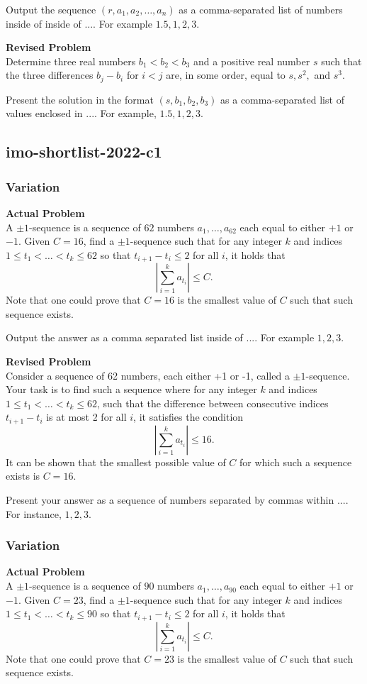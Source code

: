 Output the sequence $(r, a_1, a_2, \ldots, a_n)$ as a comma-separated list of numbers inside of inside of $\boxed{...}$. For example $\boxed{1.5, 1, 2, 3}$.

\textbf{Revised Problem}\\
Determine three real numbers \( b_1 < b_2 < b_3 \) and a positive real number \( s \) such that the three differences \( b_j - b_i \) for \( i < j \) are, in some order, equal to \( s, s^2, \) and \( s^3 \).

Present the solution in the format \((s, b_1, b_2, b_3)\) as a comma-separated list of values enclosed in \(\boxed{...}\). For example, \(\boxed{1.5, 1, 2, 3}\).

\subsection{imo-shortlist-2022-c1}
\subsubsection{Variation}
\textbf{Actual Problem}\\
A $\pm 1$-sequence is a sequence of $62$ numbers $a_1, \ldots, a_{62}$ each equal to either $+1$ or $-1$. 
Given $C = 16$, find a $\pm 1$-sequence such that for any integer $k$ and indices $1 \le t_1 < \ldots < t_k \le 62$ so that $t_{i+1} - t_i \le 2$ for all $i$, it holds that $$\left| \sum_{i = 1}^{k} a_{t_i} \right| \leq C.$$
Note that one could prove that $C = 16$ is the smallest value of $C$ such that such sequence exists.


Output the answer as a comma separated list inside of $\boxed{...}$. For example $\boxed{1, 2, 3}$.

\textbf{Revised Problem}\\
Consider a sequence of 62 numbers, each either +1 or -1, called a $\pm 1$-sequence. Your task is to find such a sequence where for any integer $k$ and indices $1 \leq t_1 < \ldots < t_k \leq 62$, such that the difference between consecutive indices $t_{i+1} - t_i$ is at most 2 for all $i$, it satisfies the condition $$\left| \sum_{i = 1}^{k} a_{t_i} \right| \leq 16.$$ It can be shown that the smallest possible value of $C$ for which such a sequence exists is $C = 16$.

Present your answer as a sequence of numbers separated by commas within $\boxed{...}$. For instance, $\boxed{1, 2, 3}$.

\subsubsection{Variation}
\textbf{Actual Problem}\\
A $\pm 1$-sequence is a sequence of $90$ numbers $a_1, \ldots, a_{90}$ each equal to either $+1$ or $-1$. 
Given $C = 23$, find a $\pm 1$-sequence such that for any integer $k$ and indices $1 \le t_1 < \ldots < t_k \le 90$ so that $t_{i+1} - t_i \le 2$ for all $i$, it holds that $$\left| \sum_{i = 1}^{k} a_{t_i} \right| \leq C.$$
Note that one could prove that $C = 23$ is the smallest value of $C$ such that such sequence exists.


